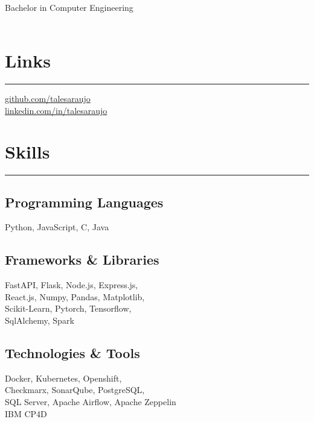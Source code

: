 \documentclass[]{rahulworld-resume}
\begin{document}
%
%

\begin{minipage}[t]{0.33\textwidth}
\begin{large}
	\\
\end{large}
Bachelor in Computer Engineering\\
\\

\section{Links}
\noindent\rule{5cm}{0.4pt}

\href{https://github.com/talesaraujo}{github.com/talesaraujo} \\
\href{https://www.linkedin.com/in/talesaraujo/}{linkedin.com/in/talesaraujo} \\
\section{Skills}
\noindent\rule{5cm}{0.4pt}

\subsection{Programming Languages}
Python, JavaScript, C, Java
\vspace{7pt}
\subsection{Frameworks \& Libraries}
FastAPI, Flask, Node.js, Express.js, \\
React.js, Numpy, Pandas, Matplotlib, \\
Scikit-Learn, Pytorch, Tensorflow, \\
SqlAlchemy, Spark
\vspace{7pt}
\subsection{Technologies \& Tools}
Docker, Kubernetes, Openshift, \\
Checkmarx, SonarQube, PostgreSQL, \\
SQL Server, Apache Airflow, Apache Zeppelin \\
IBM CP4D
\vspace{7pt}

\end{minipage}
\end{document}
